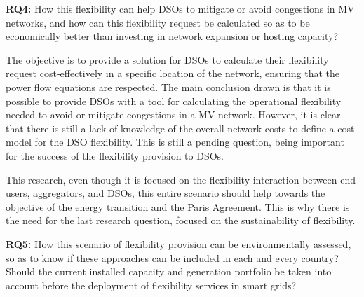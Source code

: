 
\begin{tcolorbox}
\textbf{RQ4:} How this flexibility can help DSOs to mitigate or avoid congestions in MV networks, and how can this flexibility request be calculated so as to be economically better than investing in network expansion or hosting capacity?
\end{tcolorbox}

The objective is to provide a solution for DSOs to calculate their flexibility request cost-effectively in a specific location of the network, ensuring that the power flow equations are respected. The main conclusion drawn is that it is possible to provide DSOs with a tool for calculating the operational flexibility needed to avoid or mitigate congestions in a MV network. However, it is clear that there is still a lack of knowledge of the overall network costs to define a cost model for the DSO flexibility. This is still a pending question, being important for the success of the flexibility provision to DSOs.

This research, even though it is focused on the flexibility interaction between end-users, aggregators, and DSOs, this entire scenario should help towards the objective of the energy transition and the Paris Agreement. This is why there is the need for the last research question, focused on the sustainability of flexibility.


\begin{tcolorbox}
\textbf{RQ5:} How this scenario of flexibility provision can be environmentally assessed, so as to know if these approaches can be included in each and every country? Should the current installed capacity and generation portfolio be taken into account before the deployment of flexibility services in smart grids?
\end{tcolorbox}

